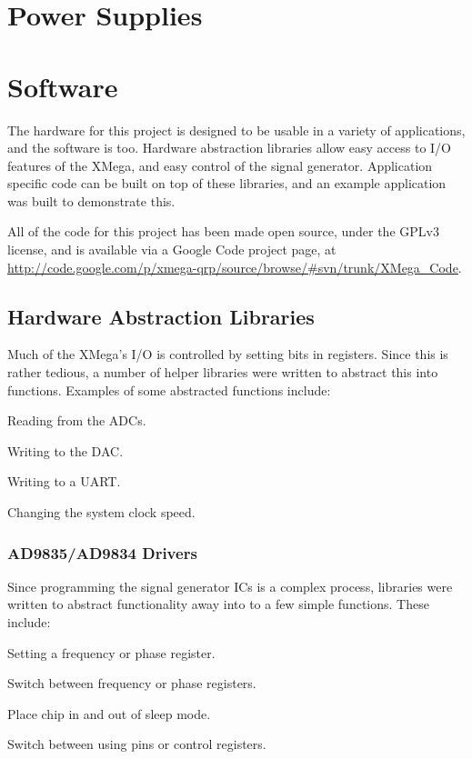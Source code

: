 \documentclass[a4paper,12pt]{article}
\newenvironment{packed_itemize}{
\begin{itemize}
  \setlength{\itemsep}{1pt}
  \setlength{\parskip}{0pt}
  \setlength{\parsep}{0pt}
}{\end{itemize}}
\begin{document}
\section{Power Supplies}



\section{Software}
The hardware for this project is designed to be usable in a variety of applications, and the software is too. Hardware abstraction libraries allow easy access to I/O features of the XMega, and easy control of the signal generator. Application specific code can be built on top of these libraries, and an example application was built to demonstrate this. 

All of the code for this project has been made open source, under the GPLv3 license, and is available via a Google Code project page, at \url{http://code.google.com/p/xmega-qrp/source/browse/#svn/trunk/XMega_Code}.

\subsection{Hardware Abstraction Libraries}
Much of the XMega's I/O is controlled by setting bits in registers. Since this is rather tedious, a number of helper libraries were written to abstract this into functions. Examples of some abstracted functions include:
\begin{packed_itemize}
\item Reading from the ADCs.
\item Writing to the DAC.
\item Writing to a UART.
\item Changing the system clock speed.
\end{packed_itemize}

\subsubsection{AD9835/AD9834 Drivers}
Since programming the signal generator ICs is a complex process, libraries were written to abstract functionality away into to a few simple functions. These include:
\begin{packed_itemize}
\item Setting a frequency or phase register.
\item Switch between frequency or phase registers.
\item Place chip in and out of sleep mode.
\item Switch between using pins or control registers.
\end{packed_itemize}
\end{document}
